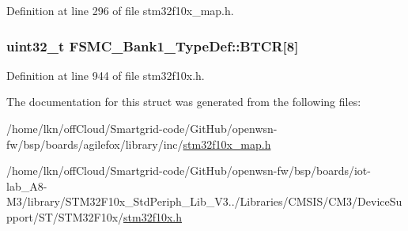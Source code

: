 Definition at line 296 of file stm32f10x\+\_\+map.\+h.

\subsubsection[{\texorpdfstring{B\+T\+CR}{BTCR}}]{ {\bf uint32\+\_\+t} F\+S\+M\+C\+\_\+\+Bank1\+\_\+\+Type\+Def\+::\+B\+T\+CR\mbox{[}8\mbox{]}}\hypertarget{struct_f_s_m_c___bank1___type_def_a6d3aefd66a99e71ae4a22444a507a720}{}\label{struct_f_s_m_c___bank1___type_def_a6d3aefd66a99e71ae4a22444a507a720}


Definition at line 944 of file stm32f10x.\+h.



The documentation for this struct was generated from the following files\+:\begin{DoxyCompactItemize}
\item 
/home/lkn/off\+Cloud/\+Smartgrid-\/code/\+Git\+Hub/openwsn-\/fw/bsp/boards/agilefox/library/inc/\hyperlink{agilefox_2library_2inc_2stm32f10x__map_8h}{stm32f10x\+\_\+map.\+h}\item 
/home/lkn/off\+Cloud/\+Smartgrid-\/code/\+Git\+Hub/openwsn-\/fw/bsp/boards/iot-\/lab\+\_\+\+A8-\/\+M3/library/\+S\+T\+M32\+F10x\+\_\+\+Std\+Periph\+\_\+\+Lib\+\_\+\+V3../\+Libraries/\+C\+M\+S\+I\+S/\+C\+M3/\+Device\+Support/\+S\+T/\+S\+T\+M32\+F10x/\hyperlink{iot-lab___a8-_m3_2library_2_s_t_m32_f10x___std_periph___lib___v3_85_80_2_libraries_2_c_m_s_i_s_26497265545392eb5694b064ae15018db}{stm32f10x.\+h}\end{DoxyCompactItemize}
